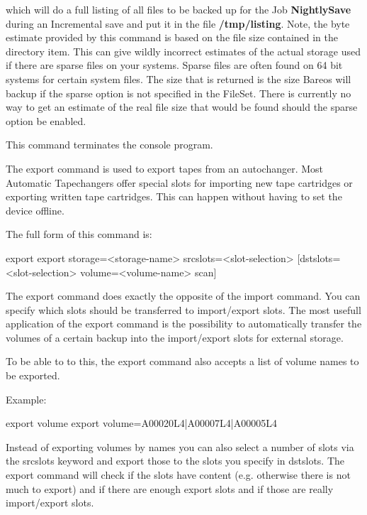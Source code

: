 \begin{description}
   which will do a full listing of all files to be backed up for the  Job {\bf
   NightlySave} during an Incremental save and put it in the  file {\bf
   /tmp/listing}.  Note, the byte estimate provided by this command is
   based on the file size contained in the directory item. This can give
   wildly incorrect estimates of the actual storage used if there are
   sparse files on your systems. Sparse files are often found on 64 bit
   systems for certain system files. The size that is returned is the size
   Bareos will backup if the sparse option is not specified in the FileSet.
   There is currently no way to get an estimate of the real file size that
   would be found should the sparse option be enabled.

\item [exit]
   This command terminates the console program.

\item [export]
   The export command is used to export tapes from an autochanger. Most Automatic
   Tapechangers offer special slots for importing new tape cartridges or
   exporting written tape cartridges. This can happen without having to set
   the device offline.

   The full form of this command is:

\begin{bconsole}{export}
export storage=<storage-name> srcslots=<slot-selection> [dstslots=<slot-selection> volume=<volume-name> scan]
\end{bconsole}

   The export command does exactly the opposite of the import command. You
   can specify which slots should be transferred to import/export slots. The
   most usefull application of the export command is the possibility to
   automatically transfer the volumes of a certain backup into the import/export
   slots for external storage.

   To be able to to this, the export command also accepts a list of volume names
   to be exported.

   Example:

\begin{bconsole}{export volume}
export volume=A00020L4|A00007L4|A00005L4
\end{bconsole}

   Instead of exporting volumes by names you can also select a number of slots via
   the srcslots keyword and export those to the slots you specify in dstslots. The export
   command will check if the slots have content (e.g. otherwise there is not much to
   export) and if there are enough export slots and if those are really import/export slots.


\end{description}
